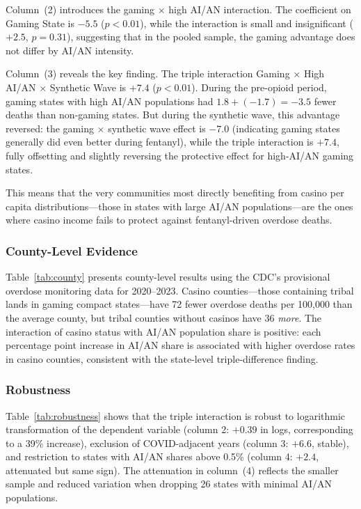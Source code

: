 \documentclass[12pt]{article}
\begin{document}
Column~(2) introduces the gaming $\times$ high AI/AN interaction. The coefficient on Gaming State is $-5.5$ ($p < 0.01$), while the interaction is small and insignificant ($+2.5$, $p = 0.31$), suggesting that in the pooled sample, the gaming advantage does not differ by AI/AN intensity.

Column~(3) reveals the key finding. The triple interaction Gaming $\times$ High AI/AN $\times$ Synthetic Wave is $+7.4$ ($p < 0.01$). During the pre-opioid period, gaming states with high AI/AN populations had $1.8 + (-1.7) = -3.5$ fewer deaths than non-gaming states. But during the synthetic wave, this advantage reversed: the gaming $\times$ synthetic wave effect is $-7.0$ (indicating gaming states generally did even better during fentanyl), while the triple interaction is $+7.4$, fully offsetting and slightly reversing the protective effect for high-AI/AN gaming states.

This means that the very communities most directly benefiting from casino per capita distributions---those in states with large AI/AN populations---are the ones where casino income fails to protect against fentanyl-driven overdose deaths.



\subsubsection*{County-Level Evidence} Table~\ref{tab:county} presents county-level results using the CDC's provisional overdose monitoring data for 2020--2023. Casino counties---those containing tribal lands in gaming compact states---have 72 fewer overdose deaths per 100,000 than the average county, but tribal counties without casinos have 36 \textit{more}. The interaction of casino status with AI/AN population share is positive: each percentage point increase in AI/AN share is associated with higher overdose rates in casino counties, consistent with the state-level triple-difference finding.



\subsubsection*{Robustness} Table~\ref{tab:robustness} shows that the triple interaction is robust to logarithmic transformation of the dependent variable (column 2: $+0.39$ in logs, corresponding to a 39\% increase), exclusion of COVID-adjacent years (column 3: $+6.6$, stable), and restriction to states with AI/AN shares above 0.5\% (column 4: $+2.4$, attenuated but same sign). The attenuation in column~(4) reflects the smaller sample and reduced variation when dropping 26 states with minimal AI/AN populations.
\end{document}
